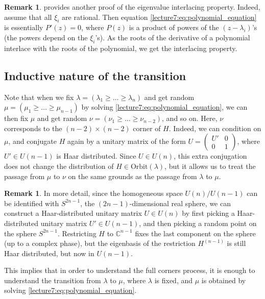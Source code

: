 \documentclass[letterpaper,11pt,oneside,reqno]{book}
\numberwithin{equation}{chapter}  %
\theoremstyle{definition}
\newtheorem{remark}[proposition]{Remark}
\begin{document}
\begin{remark}
	provides another proof of the eigenvalue interlacing property.
	Indeed, assume that all $\xi_i$ are rational. Then
	equation
	\eqref{lecture7:eq:polynomial_equation} is essentially $P'(z)=0$,
	where $P(z)$ is a product of powers of the $(z-\lambda_i)$'s
	(the powers depend on the $\xi_i$'s).
	As the roots of the derivative of a polynomial interlace with the roots of the polynomial,
	we get the interlacing property.
\end{remark}

\subsection{Inductive nature of the transition}

Note that when we fix $\lambda=(\lambda_1\ge \ldots \ge \lambda_n )$
and get random $\mu=(\mu_1\ge \ldots \ge \mu_{n-1} )$ by solving
\eqref{lecture7:eq:polynomial_equation}, we can then fix $\mu$ and get random
$\nu=(\nu_1\ge \ldots \ge \nu_{n-2} )$, and so on.
Here, $\nu$ corresponds to the $(n-2)\times(n-2)$ corner of $H$.
Indeed, we can condition on $\mu$, and conjugate $H$ again by a
unitary matrix of the form $U=\begin{pmatrix}
	U'&0\\0&1
\end{pmatrix}$, where $U'\in U(n-1)$ is Haar distributed.
Since $U\in U(n)$, this extra conjugation does not change the distribution of $H\in \mathrm{Orbit}(\lambda)$,
but it allows us to treat the passage from $\mu$ to $\nu$ on the same grounds as the
passage from $\lambda$ to $\mu$.

\begin{remark}
	In more detail, since the homogeneous space $U(n)/U(n-1)$
	can be identified with $S^{2n-1}$, the $(2n-1)$-dimensional real sphere,
	we can construct a Haar-distributed unitary matrix $U\in U(n)$
	by first picking a Haar-distributed unitary matrix $U'\in U(n-1)$,
	and then picking a random point on the sphere $S^{2n-1}$.
	Restricting $H$ to $\mathbb{C}^{n-1}$ fixes the last component on the sphere
	(up to a complex phase), but the eigenbasis of the restriction $H^{(n-1)}$
	is still Haar distributed, but now in $U(n-1)$.
\end{remark}

This implies that in order to understand the full corners process, it is enough to understand the transition from $\lambda$ to $\mu$,
where $\lambda$ is fixed, and $\mu$ is obtained by solving \eqref{lecture7:eq:polynomial_equation}.
\end{document}
